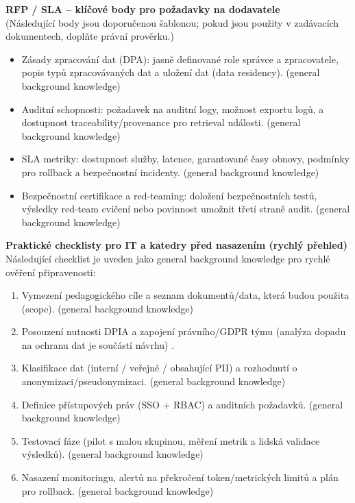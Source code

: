 \documentclass{report}%
\begin{document}
\medskip

\textbf{RFP / SLA – klíčové body pro požadavky na dodavatele} \\
(Následující body jsou doporučenou šablonou; pokud jsou použity v zadávacích dokumentech, doplňte právní prověrku.)
\begin{itemize}
  \item Zásady zpracování dat (DPA): jasně definované role správce a zpracovatele, popis typů zpracovávaných dat a uložení dat (data residency). (general background knowledge)
  \item Auditní schopnosti: požadavek na auditní logy, možnost exportu logů, a dostupnost traceability/provenance pro retrieval události. (general background knowledge)
  \item SLA metriky: dostupnost služby, latence, garantované časy obnovy, podmínky pro rollback a bezpečnostní incidenty. (general background knowledge)
  \item Bezpečnostní certifikace a red‑teaming: doložení bezpečnostních testů, výsledky red‑team cvičení nebo povinnost umožnit třetí straně audit. (general background knowledge)
\end{itemize}

\medskip

\textbf{Praktické checklisty pro IT a katedry před nasazením (rychlý přehled)} \\
Následující checklist je uveden jako general background knowledge pro rychlé ověření připravenosti:
\begin{enumerate}
  \item Vymezení pedagogického cíle a seznam dokumentů/data, která budou použita (scope). (general background knowledge)
  \item Posouzení nutnosti DPIA a zapojení právního/GDPR týmu (analýza dopadu na ochranu dat je součástí návrhu) \cite{kb_malinka_chatgpt_ve_vyuce_dva_roky_pote_2024_pdf_90bc3aaf_page_12_1}.
  \item Klasifikace dat (interní / veřejné / obsahující PII) a rozhodnutí o anonymizaci/pseudonymizaci. (general background knowledge)
  \item Definice přístupových práv (SSO + RBAC) a auditních požadavků. (general background knowledge)
  \item Testovací fáze (pilot s malou skupinou, měření metrik a lidská validace výsledků). (general background knowledge)
  \item Nasazení monitoringu, alertů na překročení token/metrických limitů a plán pro rollback. (general background knowledge)
\end{enumerate}
\end{document}
